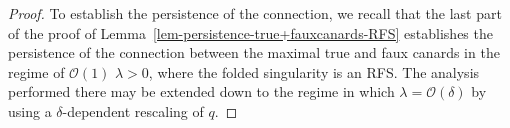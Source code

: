 \documentclass[10pt,a4paper]{amsart}
\begin{document}
\begin{proof}
To establish the persistence of the connection, we recall that the last part of the proof of Lemma~\ref{lem-persistence-true+fauxcanards-RFS} establishes the persistence of the connection between the maximal true and faux canards in the regime of $\mathcal O(1)$ $\lambda>0$, where the folded singularity is an RFS.
The analysis performed there may be extended down to the regime in which $\lambda=\mathcal{O}(\delta)$ by using a $\delta$-dependent rescaling of $q$.
\end{proof}
\end{document}
